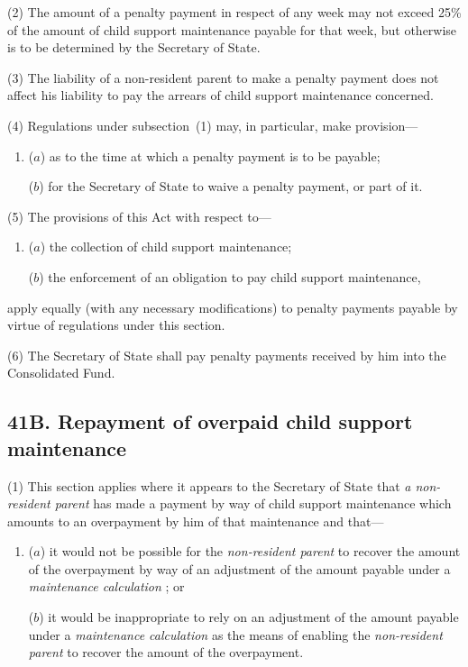 \documentclass[12pt,a4paper]{article}
\begin{document}
(2) The amount of a penalty payment in respect of any week may not exceed 25\% of the amount of child support maintenance payable for that week, but otherwise is to be determined by the Secretary of State.

(3) The liability of a non-resident parent to make a penalty payment does not affect his liability to pay the arrears of child support maintenance concerned.

(4) Regulations under subsection~(1)  may, in particular, make provision—
\begin{enumerate}\item[]
($a$) as to the time at which a penalty payment is to be payable;

($b$) for the Secretary of State to waive a penalty payment, or part of it.
\end{enumerate}

(5) The provisions of this Act with respect to—
\begin{enumerate}\item[]
($a$) the collection of child support maintenance;

($b$) the enforcement of an obligation to pay child support maintenance,
\end{enumerate}
apply equally (with any necessary modifications) to penalty payments payable by virtue of regulations under this section.

(6) The Secretary of State shall pay penalty payments received by him into the Consolidated Fund.


\subsection{41B. Repayment of overpaid child support maintenance}

(1) This section applies where it appears to the Secretary of State that 
\emph{a non-resident parent}  %
has made a payment by way of child support maintenance which amounts to an overpayment by him of that maintenance and that—
\begin{enumerate}\item[]
($a$) it would not be possible for the 
\emph{non-resident parent}  %
to recover the amount of the overpayment by way of an adjustment of the amount payable under a 
\emph{maintenance calculation}%
; or

($b$) it would be inappropriate to rely on an adjustment of the amount payable under a 
\emph{maintenance calculation}  %
as the means of enabling the 
\emph{non-resident parent}  %
to recover the amount of the overpayment.
\end{enumerate}
\end{document}

